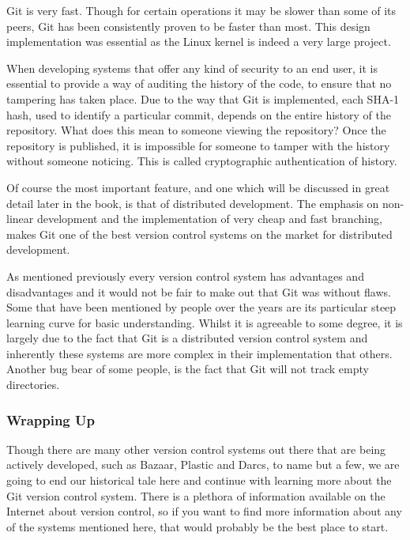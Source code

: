 Git is very fast.  Though for certain operations it may be slower than some of its peers, Git has been consistently proven to be faster than most.  This design implementation was essential as the Linux kernel is indeed a very large project.  

When developing systems that offer any kind of security to an end user, it is essential to provide a way of auditing the history of the code, to ensure that no tampering has taken place.  Due to the way that Git is implemented, each SHA-1 hash, used to identify a particular commit, depends on the entire history of the repository.  What does this mean to someone viewing the repository?  Once the repository is published, it is impossible for someone to tamper with the history without someone noticing.  This is called cryptographic authentication of history.

Of course the most important feature, and one which will be discussed in great detail later in the book, is that of distributed development.  The emphasis on non-linear development and the implementation of very cheap and fast branching, makes Git one of the best version control systems on the market for distributed development.

As mentioned previously every version control system has advantages and disadvantages and it would not be fair to make out that Git was without flaws.  Some that have been mentioned by people over the years are its particular steep learning curve for basic understanding.  Whilst it is agreeable to some degree, it is largely due to the fact that Git is a distributed version control system and inherently these systems are more complex in their implementation that others.  Another bug bear of some people, is the fact that Git will not track empty directories.  

\subsubsection{Wrapping Up}
Though there are many other version control systems out there that are being actively developed, such as Bazaar, Plastic and Darcs, to name but a few, we are going to end our historical tale here and continue with learning more about the Git version control system.  There is a plethora of information available on the Internet about version control, so if you want to find more information about any of the systems mentioned here, that would probably be the best place to start.


